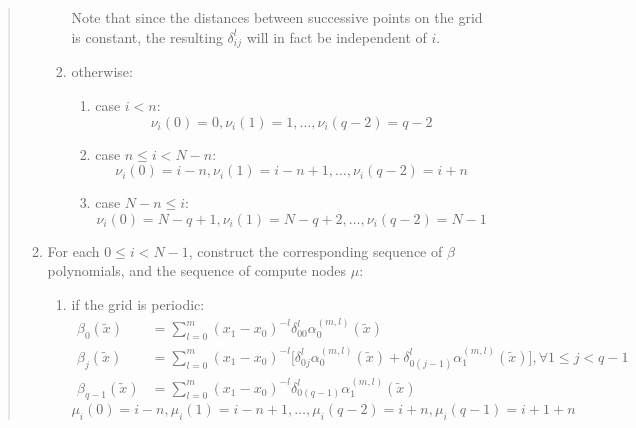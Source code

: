 \documentclass[11pt]{article}
\begin{document}
\begin{quotation}
\begin{enumerate}
\begin{enumerate}
                        Note that since the distances between successive points on the grid is constant, the
                        resulting $\delta_{ij}^l$ will in fact be independent of $i$.
                    \item
                        otherwise:

                        \begin{enumerate}
                            \item
                                case $i < n$:
                                $$\nu_i(0) = 0, \nu_i(1) = 1, \ldots, \nu_i(q - 2) = q-2$$
                            \item
                                case $n \leq i < N - n$:
                                $$\nu_i(0) = i - n, \nu_i(1) = i - n + 1, \ldots, \nu_i(q - 2) = i+n$$
                            \item
                                case $N-n \leq i$:
                                $$\nu_i(0) = N - q + 1, \nu_i(1) = N - q + 2, \ldots, \nu_i(q - 2) = N-1$$
                        \end{enumerate}
                \end{enumerate}
            \item
                For each $0 \leq i < N-1$, construct the corresponding sequence of $\beta$ polynomials, and the
                sequence of compute nodes $\mu$:
                \begin{enumerate}
                    \item
                        if the grid is periodic:
                        \begin{align}
                            \beta_{0}(\tilde{x}) &=
                                \sum_{l = 0}^m
                                (x_1 - x_0)^{-l}
                                \delta_{00}^l \alpha_0^{(m, l)}(\tilde{x}) \\
                            \beta_{j}(\tilde{x}) &=
                                \sum_{l = 0}^m
                                (x_1 - x_0)^{-l}
                                \Big[\delta_{0j}^l \alpha_0^{(m, l)}(\tilde{x}) +
                                     \delta_{0(j-1)}^l \alpha_1^{(m, l)}(\tilde{x})\Big],
                            \forall 1 \leq j < q-1 \\
                            \beta_{q-1}(\tilde{x}) &=
                                \sum_{l = 0}^m
                                (x_1 - x_0)^{-l}
                                \delta_{0(q-1)}^l \alpha_1^{(m, l)}(\tilde{x})
                        \end{align}
                        \begin{equation}
                            \mu_i(0) = i-n, \mu_i(1) = i-n+1, \ldots, \mu_i(q-2) = i+n, \mu_i(q-1) = i+1+n
                        \end{equation}


\end{enumerate}
\end{enumerate}
\end{quotation}
\end{document}
